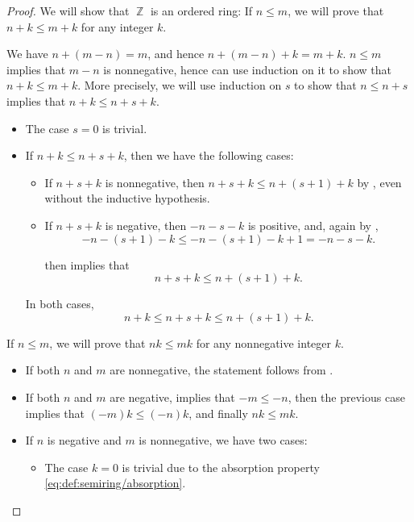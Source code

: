 \begin{proof}
   We will show that \( \BbbZ \) is an ordered ring:
   If \( n \leq m \), we will prove that \( n + k \leq m + k \) for any integer \( k \).

  We have \( n + (m - n) = m \), and hence \( n + (m - n) + k = m + k \). \( n \leq m \) implies that \( m - n \) is nonnegative, hence can use induction on it to show that \( n + k \leq m + k \). More precisely, we will use induction on \( s \) to show that \( n \leq n + s \) implies that \( n + k \leq n + s + k \).

  \begin{itemize}
    \item The case \( s = 0 \) is trivial.
    \item If \( n + k \leq n + s + k \), then we have the following cases:
    \begin{itemize}
      \item If \( n + s + k \) is nonnegative, then \( n + s + k \leq n + (s + 1) + k \) by , even without the inductive hypothesis.
      \item If \( n + s + k \) is negative, then \( -n - s - k \) is positive, and, again by ,
      \begin{equation*}
        -n - (s + 1) - k \leq -n - (s + 1) - k + 1 = -n - s - k.
      \end{equation*}

       then implies that
      \begin{equation*}
        n + s + k \leq n + (s + 1) + k.
      \end{equation*}
    \end{itemize}

    In both cases,
    \begin{equation*}
      n + k \leq n + s + k \leq n + (s + 1) + k.
    \end{equation*}
  \end{itemize}

   If \( n \leq m \), we will prove that \( nk \leq mk \) for any nonnegative integer \( k \).

  \begin{itemize}
    \item If both \( n \) and \( m \) are nonnegative, the statement follows from .
    \item If both \( n \) and \( m \) are negative,  implies that \( -m \leq -n \), then the previous case implies that \( (-m)k \leq (-n)k \), and finally \( nk \leq mk \).
    \item If \( n \) is negative and \( m \) is nonnegative, we have two cases:
      \begin{itemize}
        \item The case \( k = 0 \) is trivial due to the absorption property \eqref{eq:def:semiring/absorption}.


\end{itemize}
\end{itemize}
\end{proof}

